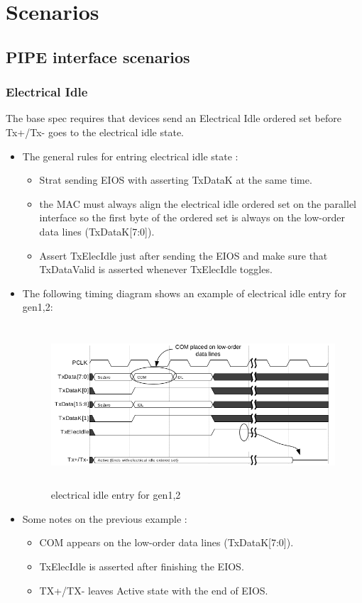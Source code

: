 \chapter{Scenarios}
\section{PIPE interface scenarios}

    \subsection{Electrical Idle} 
    The base spec requires that devices send an Electrical Idle ordered set before Tx+/Tx- goes to the electrical idle state.
    \begin{itemize}
        \item The general rules for entring electrical idle state :
\begin{itemize}
    \item Strat sending EIOS with asserting TxDataK at the same time.
\item the MAC must always align the electrical idle ordered set on the parallel interface so the first byte of the ordered set is always on the low-order data lines (TxDataK[7:0]).

\item Assert TxElecIdle just after sending the EIOS and make sure that TxDataValid is asserted whenever TxElecIdle toggles.

\end{itemize}
\item 
The following timing diagram shows an example of electrical idle entry for gen1,2:

\begin{figure}[H]
  \centering
  \includegraphics[width=130mm,height=60mm]{images/clk_diagram/EI.png}
  \caption{electrical idle entry for gen1,2}
\end{figure}
\item Some notes on the previous example :
\begin{itemize}
    \item COM appears on the low-order data lines (TxDataK[7:0]).
\item TxElecIdle is asserted after finishing the EIOS.
\item TX+/TX- leaves Active state with the end of EIOS.


\end{itemize}
\end{itemize}
